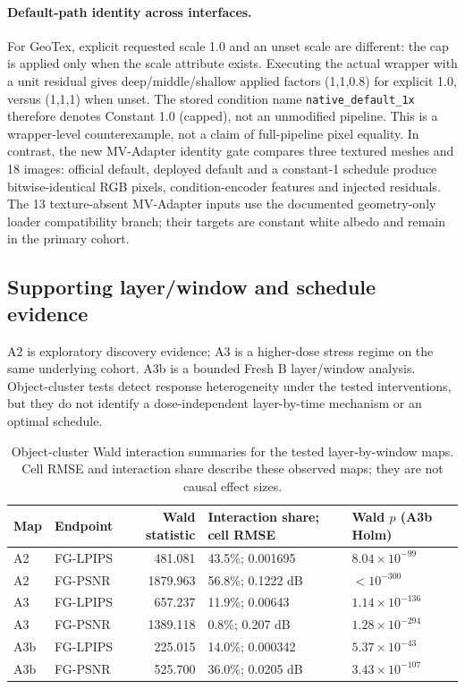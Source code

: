 \documentclass[11pt]{article}
\begin{document}
\paragraph{Default-path identity across interfaces.}
For GeoTex, explicit requested scale 1.0 and an unset scale are different: the cap is applied only when the scale attribute exists. Executing the actual wrapper with a unit residual gives deep/middle/shallow applied factors (1,1,0.8) for explicit 1.0, versus (1,1,1) when unset. The stored condition name \texttt{native\_default\_1x} therefore denotes Constant 1.0 (capped), not an unmodified pipeline. This is a wrapper-level counterexample, not a claim of full-pipeline pixel equality. In contrast, the new MV-Adapter identity gate compares three textured meshes and 18 images: official default, deployed default and a constant-1 schedule produce bitwise-identical RGB pixels, condition-encoder features and injected residuals. The 13 texture-absent MV-Adapter inputs use the documented geometry-only loader compatibility branch; their targets are constant white albedo and remain in the primary cohort.



\clearpage

\subsection*{Supporting layer/window and schedule evidence}
A2 is exploratory discovery evidence; A3 is a higher-dose stress regime on the same underlying cohort. A3b is a bounded Fresh B layer/window analysis. Object-cluster tests detect response heterogeneity under the tested interventions, but they do not identify a dose-independent layer-by-time mechanism or an optimal schedule.

\begin{table}[ht]
\centering\small
\caption{Object-cluster Wald interaction summaries for the tested layer-by-window maps. Cell RMSE and interaction share describe these observed maps; they are not causal effect sizes.}\label{tab:supp-layerwindow}
\begin{tabular}{lp{2.1cm}rp{4.2cm}p{2.6cm}}\toprule Map & Endpoint & Wald statistic & Interaction share; cell RMSE & Wald $p$ (A3b Holm) \\\midrule
A2 & FG-LPIPS & 481.081 & 43.5\%; 0.001695 & $8.04\times10^{-99}$ \\
A2 & FG-PSNR & 1879.963 & 56.8\%; 0.1222 dB & $<10^{-300}$ \\
A3 & FG-LPIPS & 657.237 & 11.9\%; 0.00643 & $1.14\times10^{-136}$ \\
A3 & FG-PSNR & 1389.118 & 0.8\%; 0.207 dB & $1.28\times10^{-294}$ \\
A3b & FG-LPIPS & 225.015 & 14.0\%; 0.000342 & $5.37\times10^{-43}$ \\
A3b & FG-PSNR & 525.700 & 36.0\%; 0.0205 dB & $3.43\times10^{-107}$ \\
\bottomrule\end{tabular}
\end{table}
\end{document}

